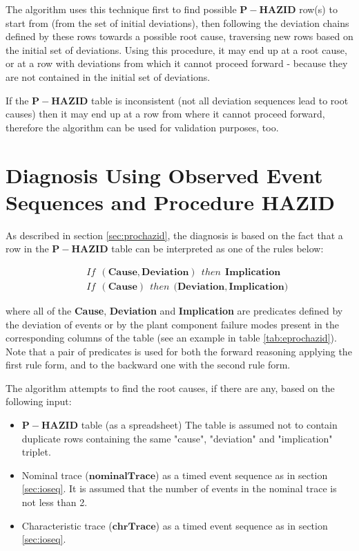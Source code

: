 \documentclass[conference]{IEEEtran}
\begin{document}
The algorithm uses this technique first to find possible  $\mathbf{P-HAZID}$ row(s) to start from (from the set of initial deviations), then following the deviation chains defined by these rows towards a possible root cause, traversing new rows based on the initial set of deviations. Using this procedure, it may end up at a root cause, or at a row with deviations from which it cannot proceed forward - because they are not contained in the initial set of deviations. 

If the $\mathbf{P-HAZID}$ table is inconsistent (not all deviation sequences lead to root causes) then it may end up at a row from where it cannot proceed forward, therefore the algorithm can be used for validation purposes, too. 

%
\section{Diagnosis Using Observed Event Sequences and Procedure HAZID}
\label{sec:reasoning}

As described in section \ref{sec:prochazid}, the diagnosis is based on the fact that a row in the $\mathbf{P-HAZID}$
table can be interpreted as one of the rules below:
\begin{small}
\begin{eqnarray*}
&& If~~\mathbf{(Cause,Deviation)}~~then~~\mathbf{Implication} \\
&& If~~\mathbf{(Cause)}~~then~~\mathbf{(Deviation,Implication})
\end{eqnarray*}
\end{small}
\noindent where all of the \textbf{Cause}, \textbf{Deviation} and \textbf{Implication}
 are predicates
 defined by the deviation of events or by the plant component failure modes
present in the corresponding columns of the table (see an example in table \ref{tab:eprochazid}).
Note that a pair of predicates is used for both the forward reasoning
 applying the first rule form, and to the backward one with the second rule form.

 
The algorithm attempts to find the root causes, if there are any, based on the following input:
\begin{itemize}
	\item $\mathbf{P-HAZID}$ table (as a spreadsheet) The table is assumed not to contain duplicate rows containing the same "cause", "deviation" and "implication" triplet.
	\item Nominal trace ($\mathbf{nominalTrace}$) as a timed event sequence as in section \ref{sec:ioseq}. It is assumed that the number of events in the nominal trace is not less than 2.
	\item Characteristic trace ($\mathbf{chrTrace}$) as a timed event sequence as in section \ref{sec:ioseq}.
\end{itemize}
\end{document}
